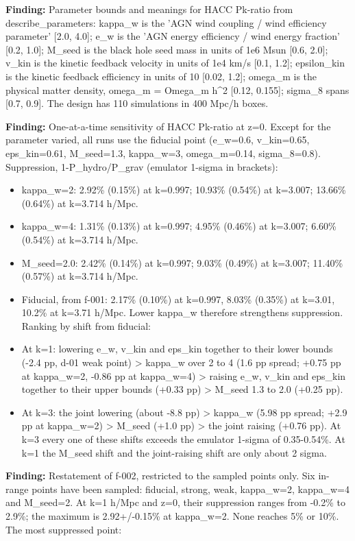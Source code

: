 \documentclass[11pt,a4paper]{article}
\begin{document}
\textbf{Finding:} Parameter bounds and meanings for HACC Pk-ratio from describe\_parameters: kappa\_w is the 'AGN wind coupling / wind efficiency parameter' [2.0, 4.0]; e\_w is the 'AGN energy efficiency / wind energy fraction' [0.2, 1.0]; M\_seed is the black hole seed mass in units of 1e6 Msun [0.6, 2.0]; v\_kin is the kinetic feedback velocity in units of 1e4 km/s [0.1, 1.2]; epsilon\_kin is the kinetic feedback efficiency in units of 10 [0.02, 1.2]; omega\_m is the physical matter density, omega\_m = Omega\_m h\textasciicircum{}2 [0.12, 0.155]; sigma\_8 spans [0.7, 0.9]. The design has 110 simulations in 400 Mpc/h boxes.

\textbf{Finding:} One-at-a-time sensitivity of HACC Pk-ratio at z=0. Except for the parameter varied, all runs use the fiducial point (e\_w=0.6, v\_kin=0.65, eps\_kin=0.61, M\_seed=1.3, kappa\_w=3, omega\_m=0.14, sigma\_8=0.8). Suppression, 1-P\_hydro/P\_grav (emulator 1-sigma in brackets):

\begin{itemize}
  \item kappa\_w=2: 2.92\% (0.15\%) at k=0.997; 10.93\% (0.54\%) at k=3.007; 13.66\% (0.64\%) at k=3.714 h/Mpc.
  \item kappa\_w=4: 1.31\% (0.13\%) at k=0.997; 4.95\% (0.46\%) at k=3.007; 6.60\% (0.54\%) at k=3.714 h/Mpc.
  \item M\_seed=2.0: 2.42\% (0.14\%) at k=0.997; 9.03\% (0.49\%) at k=3.007; 11.40\% (0.57\%) at k=3.714 h/Mpc.
  \item Fiducial, from f-001: 2.17\% (0.10\%) at k=0.997, 8.03\% (0.35\%) at k=3.01, 10.2\% at k=3.71 h/Mpc.
Lower kappa\_w therefore strengthens suppression. Ranking by shift from fiducial:

  \item At k=1: lowering e\_w, v\_kin and eps\_kin together to their lower bounds (-2.4 pp, d-01 weak point) \textgreater{} kappa\_w over 2 to 4 (1.6 pp spread; +0.75 pp at kappa\_w=2, -0.86 pp at kappa\_w=4) \textgreater{} raising e\_w, v\_kin and eps\_kin together to their upper bounds (+0.33 pp) \textgreater{} M\_seed 1.3 to 2.0 (+0.25 pp).
  \item At k=3: the joint lowering (about -8.8 pp) \textgreater{} kappa\_w (5.98 pp spread; +2.9 pp at kappa\_w=2) \textgreater{} M\_seed (+1.0 pp) \textgreater{} the joint raising (+0.76 pp).
At k=3 every one of these shifts exceeds the emulator 1-sigma of 0.35-0.54\%. At k=1 the M\_seed shift and the joint-raising shift are only about 2 sigma.

\end{itemize}
\textbf{Finding:} Restatement of f-002, restricted to the sampled points only. Six in-range points have been sampled: fiducial, strong, weak, kappa\_w=2, kappa\_w=4 and M\_seed=2. At k=1 h/Mpc and z=0, their suppression ranges from -0.2\% to 2.9\%; the maximum is 2.92+/-0.15\% at kappa\_w=2. None reaches 5\% or 10\%. The most suppressed point:
\end{document}
